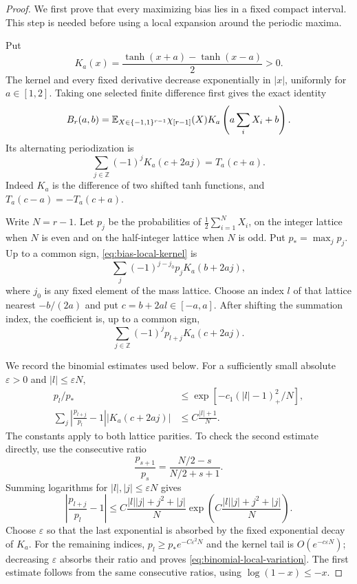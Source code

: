 \begin{proof}
We first prove that every maximizing bias lies in a fixed compact
interval. This step is needed before using a local expansion around
the periodic maxima.

Put
\[
 K_a(x)=\frac{\tanh(x+a)-\tanh(x-a)}2>0.
\]
The kernel and every fixed derivative decrease exponentially in
$|x|$, uniformly for $a\in[1,2]$. Taking one selected finite difference
first gives the exact identity
\begin{equation}\label{eq:bias-local-kernel}
 B_r(a,b)=\mathbb E_{X\in\{-1,1\}^{r-1}}
       \chi_{[r-1]}(X)K_a\left(a\sum_iX_i+b\right).
\end{equation}
Its alternating periodization is
\begin{equation}\label{eq:local-kernel-periodization}
 \sum_{j\in\mathbb Z}(-1)^jK_a(c+2aj)=T_a(c+a).
\end{equation}
Indeed $K_a$ is the difference of two shifted tanh functions, and
$T_a(c-a)=-T_a(c+a)$.

Write $N=r-1$. Let $p_j$ be the probabilities of
$\frac12\sum_{i=1}^NX_i$, on the integer lattice when $N$ is even
and on the half-integer lattice when $N$ is odd. Put
$p_*=\max_jp_j$. Up to a common sign,
\eqref{eq:bias-local-kernel} is
\[
 \sum_j(-1)^{j-j_0}p_jK_a(b+2aj),
\]
where $j_0$ is any fixed element of the mass lattice. Choose an index
$l$ of that lattice nearest $-b/(2a)$ and put $c=b+2al\in[-a,a]$.
After shifting the summation index, the coefficient is, up to a common
sign,
\begin{equation}\label{eq:shifted-binomial-kernel}
 \sum_{j\in\mathbb Z}(-1)^jp_{l+j}K_a(c+2aj).
\end{equation}

We record the binomial estimates used below. For a sufficiently small
absolute $\varepsilon>0$ and $|l|\le\varepsilon N$,
\begin{align}
 p_l/p_*&\le\exp\left[-c_1(|l|-1)_+^2/N\right],
 \label{eq:binomial-envelope}\\
 \sum_j\left|\frac{p_{l+j}}{p_l}-1\right|
       |K_a(c+2aj)|&\le C\frac{|l|+1}{N}.
 \label{eq:binomial-local-variation}
\end{align}
The constants apply to both lattice parities. To check the second
estimate directly, use the consecutive ratio
\[
 \frac{p_{s+1}}{p_s}=\frac{N/2-s}{N/2+s+1}.
\]
Summing logarithms for $|l|,|j|\le\varepsilon N$ gives
\[
 \left|\frac{p_{l+j}}{p_l}-1\right|
 \le C\frac{|l||j|+j^2+|j|}{N}
 \exp\left(C\frac{|l||j|+j^2+|j|}{N}\right).
\]
Choose $\varepsilon$ so that the last exponential is absorbed by
the fixed exponential decay of $K_a$. For the remaining indices,
$p_l\ge p_*e^{-C\varepsilon^2N}$ and the kernel tail is
$O(e^{-c\varepsilon N})$; decreasing $\varepsilon$ absorbs their
ratio and proves \eqref{eq:binomial-local-variation}.
The first estimate follows from the same consecutive ratios, using
$\log(1-x)\le-x$.


\end{proof}
